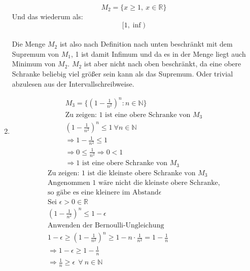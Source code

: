 \documentclass{article}
\begin{document}
\begin{enumerate}[label = (\alph*)]
                \[
                    M_2 = \{x \geq 1, \: x \in \mathbb{R}\}    
                \]
                Und das wiederum als: \\
                \[[1,\inf)\] \\
                Die Menge \(M_2\) ist also nach Definition nach unten beschränkt mit dem Supremum von \(M_1\),
                1 ist damit Infimum und da es in der Menge liegt auch Minimum von \(M_2\).
                \(M_2\) ist aber nicht nach oben beschränkt, da eine obere Schranke beliebig viel größer sein kann
                als das Supremum. Oder trivial abzulesen aus der Intervallschreibweise.

                \item 
                \begin{gather*}
                    M_3 = \{{\left(1- \frac{1}{n^2}\right)}^n: n \in \mathbb{N} \} \\
                    \text{Zu zeigen: 1 ist eine obere Schranke von } M_3 \\
                    {\left(1- \frac{1}{n^2}\right)}^n \leq 1 \: \forall n \in \mathbb{N} \\
                    \Rightarrow 1- \frac{1}{n^2} \leq 1 \\
                    \Rightarrow 0 \leq \frac{1}{n^2} \Rightarrow 0 < 1 \\
                    \Rightarrow \text{1 ist eine obere Schranke von } M_3
                \end{gather*} 
                \begin{gather*}
                    \text{Zu zeigen: 1 ist die kleinste obere Schranke von } M_3 \\
                    \text{Angenommen 1 wäre nicht die kleinste obere Schranke,} \\
                    \text{so gäbe es eine kleinere im Abstand} \epsilon \\
                    \text{Sei } \epsilon > 0 \in \mathbb{R} \\
                    {\left(1- \frac{1}{n^2}\right)}^n \leq 1 - \epsilon \\
                    \text{Anwenden der Bernoulli-Ungleichung} \\
                    1 - \epsilon \geq {\left(1- \frac{1}{n^2}\right)}^n \geq 1 - n \cdot \frac{1}{n^2} = 1 - \frac{1}{n} \\
                    \Rightarrow 1- \epsilon \geq 1 - \frac{1}{n} \\
                    \Rightarrow \frac{1}{n} \geq \epsilon \: \: \forall \: n \in \mathbb{N}\\

\end{gather*}
\end{enumerate}
\end{document}
